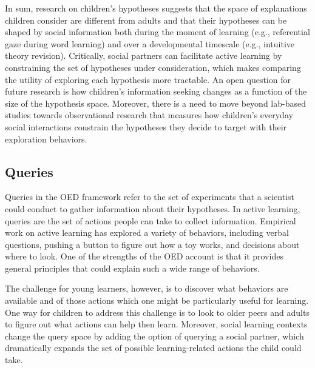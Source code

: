 \documentclass[oneside]{report}
\begin{document}
In sum, research on children's hypotheses suggests that the space of
explanations children consider are different from adults and that their
hypotheses can be shaped by social information both during the moment of
learning (e.g., referential gaze during word learning) and over a
developmental timescale (e.g., intuitive theory revision). Critically,
social partners can facilitate active learning by constraining the set
of hypotheses under consideration, which makes comparing the utility of
exploring each hypothesis more tractable. An open question for future
research is how children's information seeking changes as a function of
the size of the hypothesis space. Moreover, there is a need to move
beyond lab-based studies towards observational research that measures
how children's everyday social interactions constrain the hypotheses
they decide to target with their exploration behaviors.

\subsection{Queries}\label{queries}

Queries in the OED framework refer to the set of experiments that a
scientist could conduct to gather information about their hypotheses. In
active learning, queries are the set of actions people can take to
collect information. Empirical work on active learning has explored a
variety of behaviors, including verbal questions, pushing a button to
figure out how a toy works, and decisions about where to look. One of
the strengths of the OED account is that it provides general principles
that could explain such a wide range of behaviors.

The challenge for young learners, however, is to discover what behaviors
are available and of those actions which one might be particularly
useful for learning. One way for children to address this challenge is
to look to older peers and adults to figure out what actions can help
then learn. Moreover, social learning contexts change the query space by
adding the option of querying a social partner, which dramatically
expands the set of possible learning-related actions the child could
take.
\end{document}
